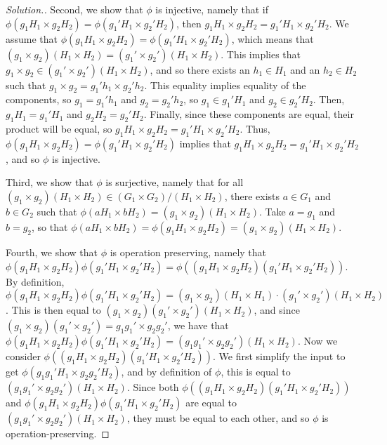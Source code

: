 \documentclass{article}
\newcommand{\sk}{\smallskip}
\begin{document}
\begin{enumerate}
\begin{enumerate}
\begin{proof}[Solution.]
            \sk
            
            Second, we show that $\phi$ is injective, namely that if $\phi(g_1H_1 \times g_2H_2) = \phi(g_1'H_1 \times g_2'H_2)$, then $g_1H_1 \times g_2H_2 = g_1'H_1 \times g_2'H_2$. We assume that $\phi(g_1H_1 \times g_2H_2) = \phi(g_1'H_1 \times g_2'H_2)$, which means that $(g_1 \times g_2)(H_1 \times H_2) = (g_1' \times g_2')(H_1 \times H_2)$. This implies that $g_1 \times g_2 \in (g_1' \times g_2')(H_1 \times H_2)$, and so there exists an $h_1 \in H_1$ and an $h_2 \in H_2$ such that $g_1 \times g_2 = g_1'h_1 \times g_2'h_2$. This equality implies equality of the components, so $g_1 = g_1'h_1$ and $g_2 = g_2'h_2$, so $g_1 \in g_1'H_1$ and $g_2 \in g_2'H_2$. Then, $g_1H_1 = g_1'H_1$ and $g_2H_2 = g_2'H_2$. Finally, since these components are equal, their product will be equal, so $g_1H_1 \times g_2H_2 = g_1'H_1 \times g_2'H_2$. Thus, $\phi(g_1H_1 \times g_2H_2) = \phi(g_1'H_1 \times g_2'H_2)$ implies that $g_1H_1 \times g_2H_2 = g_1'H_1 \times g_2'H_2$, and so $\phi$ is injective.

            \sk

            Third, we show that $\phi$ is surjective, namely that for all $(g_1 \times g_2)(H_1 \times H_2) \in (G_1 \times G_2)/(H_1 \times H_2)$, there exists $a \in G_1$ and $b \in G_2$ such that $\phi(aH_1 \times bH_2) = (g_1 \times g_2)(H_1 \times H_2)$. Take $a = g_1$ and $b = g_2$, so that $\phi(aH_1 \times bH_2) = \phi(g_1H_1 \times g_2H_2) = (g_1 \times g_2)(H_1 \times H_2)$.

            \sk

            Fourth, we show that $\phi$ is operation preserving, namely that $\phi(g_1H_1 \times g_2H_2)\phi(g_1'H_1 \times g_2'H_2) = \phi((g_1H_1 \times g_2H_2)(g_1'H_1 \times g_2'H_2))$. By definition, $\phi(g_1H_1 \times g_2H_2)\phi(g_1'H_1 \times g_2'H_2) = (g_1 \times g_2)(H_1 \times H_1) \cdot (g_1' \times g_2')(H_1 \times H_2)$. This is then equal to $(g_1 \times g_2)(g_1' \times g_2')(H_1 \times H_2)$, and since $(g_1 \times g_2)(g_1' \times g_2') = g_1g_1' \times g_2g_2'$, we have that $\phi(g_1H_1 \times g_2H_2)\phi(g_1'H_1 \times g_2'H_2) = (g_1g_1' \times g_2g_2')(H_1 \times H_2)$. Now we consider $\phi((g_1H_1 \times g_2H_2)(g_1'H_1 \times g_2'H_2))$. We first simplify the input to get $\phi(g_1g_1'H_1 \times g_2g_2'H_2)$, and by definition of $\phi$, this is equal to $(g_1g_1' \times g_2g_2')(H_1 \times H_2)$. Since both $\phi((g_1H_1 \times g_2H_2)(g_1'H_1 \times g_2'H_2))$ and $\phi(g_1H_1 \times g_2H_2)\phi(g_1'H_1 \times g_2'H_2)$ are equal to $(g_1g_1' \times g_2g_2')(H_1 \times H_2)$, they must be equal to each other, and so $\phi$ is operation-preserving. 


\end{proof}
\end{enumerate}
\end{enumerate}
\end{document}
